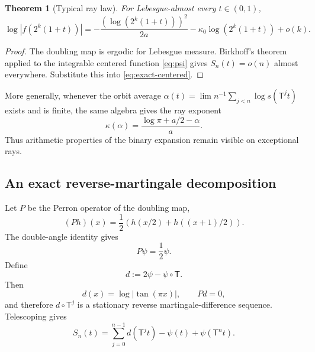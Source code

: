 \documentclass[11pt,oneside]{article}
\newtheorem{theorem}{Theorem}[section]
\theoremstyle{definition}
\theoremstyle{remark}
\newcommand{\T}{\mathsf T}
\begin{document}
\begin{theorem}[Typical ray law]
\label{thm:typical}
For Lebesgue-almost every $t\in(0,1)$,
\begin{equation}
 \log|f(2^k(1+t))|
 =-\frac{(\log(2^k(1+t)))^2}{2a}
  -\kappa_0\log(2^k(1+t))+o(k).
 \label{eq:typical}
\end{equation}
\end{theorem}

\begin{proof}
The doubling map is ergodic for Lebesgue measure.  Birkhoff's theorem applied
to the integrable centered function \eqref{eq:psi} gives $S_n(t)=o(n)$ almost
everywhere.  Substitute this into \eqref{eq:exact-centered}.
\end{proof}

More generally, whenever the orbit average
$\alpha(t)=\lim n^{-1}\sum_{j<n}\log s(\T^jt)$ exists and is finite, the same
algebra gives the ray exponent
\begin{equation}
 \kappa(\alpha)=\frac{\log\pi+a/2-\alpha}{a}.
 \label{eq:kappa-alpha}
\end{equation}
Thus arithmetic properties of the binary expansion remain visible on
exceptional rays.

\subsection{An exact reverse-martingale decomposition}

Let $P$ be the Perron operator of the doubling map,
\begin{equation}
 (Ph)(x)=\frac12\left(h(x/2)+h((x+1)/2)\right).
 \label{eq:Perron-unweighted}
\end{equation}
The double-angle identity gives
\begin{equation}
 P\psi=\frac12\psi.
 \label{eq:Ppsi}
\end{equation}
Define
\begin{equation}
 d:=2\psi-\psi\circ\T.
 \label{eq:d-def}
\end{equation}
Then
\begin{equation}
 d(x)=\log|\tan(\pi x)|,
 \qquad Pd=0,
 \label{eq:d-tan}
\end{equation}
and therefore $d\circ\T^j$ is a stationary reverse martingale-difference
sequence.  Telescoping gives
\begin{equation}
 S_n(t)=\sum_{j=0}^{n-1}d(\T^jt)-\psi(t)+\psi(\T^nt).
 \label{eq:martingale-coboundary}
\end{equation}
\end{document}
